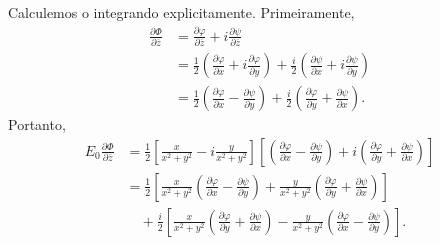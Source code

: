 \documentclass[../distribution_theory_notes.tex]{subfiles}
\begin{document}
Calculemos o integrando explicitamente. Primeiramente,
\begin{align*}
	\frac{\partial\Phi}{\partial\overline{z}}
	 & =\frac{\partial\varphi}{\partial\overline{z}}
	+i\frac{\partial\psi}{\partial\overline{z}}             \\
	 & =\frac{1}{2}\left(\frac{\partial\varphi}{\partial x}
	+i\frac{\partial\varphi}{\partial y}\right)
	+\frac{i}{2}\left(\frac{\partial\psi}{\partial x}
	+i\frac{\partial\psi}{\partial y}\right)                \\
	 & =\frac{1}{2}\left(\frac{\partial\varphi}{\partial x}
	-\frac{\partial\psi}{\partial y}\right)
	+\frac{i}{2}\left(\frac{\partial\varphi}{\partial y}
	+\frac{\partial\psi}{\partial x}\right).
\end{align*}
Portanto,
\begin{align*}
	E_{0}\frac{\partial\Phi}{\partial\overline{z}}
	 & =\frac{1}{2}
	\left[\frac{x}{x^{2}+y^{2}}-i\frac{y}{x^{2}+y^{2}}\right]
	\left[
		\left(\frac{\partial\varphi}{\partial x}-\frac{\partial\psi}{\partial y}\right)
		+i\left(\frac{\partial\varphi}{\partial y}+\frac{\partial\psi}{\partial x}\right)
	\right]               \\
	 & =\frac{1}{2}\left[
		\frac{x}{x^{2}+y^{2}}
		\left(\frac{\partial\varphi}{\partial x}-\frac{\partial\psi}{\partial y}\right)
		+\frac{y}{x^{2}+y^{2}}
		\left(\frac{\partial\varphi}{\partial y}+\frac{\partial\psi}{\partial x}\right)
	\right]               \\
	 & \quad+
	\frac{i}{2}\left[
		\frac{x}{x^{2}+y^{2}}
		\left(\frac{\partial\varphi}{\partial y}+\frac{\partial\psi}{\partial x}\right)
		-\frac{y}{x^{2}+y^{2}}
		\left(\frac{\partial\varphi}{\partial x}-\frac{\partial\psi}{\partial y}\right)
		\right].
\end{align*}
\end{document}
